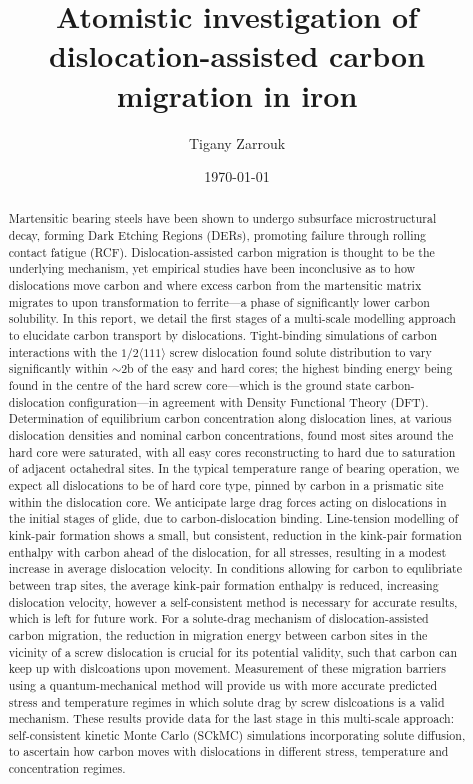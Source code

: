 \documentclass[a4paper,11pt]{article}
\author{Tigany Zarrouk}
\date{\today}
\title{Atomistic investigation of dislocation-assisted carbon migration in iron}
\begin{document}
\maketitle
\tableofcontents

\clearpage

 \begin{abstract}

Martensitic bearing steels have been shown to undergo subsurface microstructural decay,
forming Dark Etching Regions (DERs), promoting failure through rolling contact fatigue
(RCF). Dislocation-assisted carbon migration is thought to be the underlying mechanism,
yet empirical studies have been inconclusive as to how dislocations move carbon and
where excess carbon from the martensitic matrix migrates to upon transformation to
ferrite---a phase of significantly lower carbon solubility. In this report, we detail
the first stages of a multi-scale modelling approach to elucidate carbon transport by
dislocations. Tight-binding simulations of carbon interactions with the $1/2\langle 111
\rangle$ screw dislocation found solute distribution to vary significantly within
$\sim2$b of the easy and hard cores; the highest binding energy being found in the
centre of the hard screw core---which is the ground state carbon-dislocation
configuration---in agreement with Density Functional Theory (DFT). Determination of
equilibrium carbon concentration along dislocation lines, at various dislocation
densities and nominal carbon concentrations, found most sites around the hard core were
saturated, with all easy cores reconstructing to hard due to saturation of adjacent
octahedral sites. In the typical temperature range of bearing operation, we expect all
dislocations to be of hard core type, pinned by carbon in a prismatic site within the
dislocation core. We anticipate large drag forces acting on dislocations in the initial
stages of glide, due to carbon-dislocation binding.  Line-tension modelling of kink-pair
formation shows a small, but consistent, reduction in the kink-pair formation enthalpy
with carbon ahead of the dislocation, for all stresses, resulting in a modest increase
in average dislocation velocity. In conditions allowing for carbon to equlibriate
between trap sites, the average kink-pair formation enthalpy is reduced, increasing
dislocation velocity, however a self-consistent method is necessary for accurate
results, which is left for future work. For a solute-drag mechanism of
dislocation-assisted carbon migration, the reduction in migration energy between carbon
sites in the vicinity of a screw dislocation is crucial for its potential validity, such that
carbon can keep up with dislcoations upon movement. Measurement of these migration barriers using a quantum-mechanical method will provide us with more accurate predicted stress and temperature regimes in which solute drag by screw dislcoations is a valid mechanism. These results
provide data for the last stage in this multi-scale approach: self-consistent kinetic
Monte Carlo (SCkMC) simulations incorporating solute diffusion, to ascertain how carbon
moves with dislocations in different stress, temperature and concentration regimes.

 \end{abstract}
\end{document}
